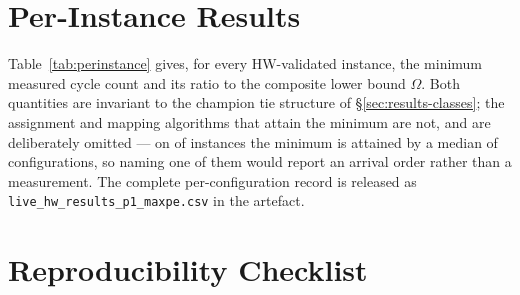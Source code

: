 \documentclass[journal,10pt]{IEEEtran}
\theoremstyle{plain}
\theoremstyle{definition}
\theoremstyle{remark}
\newcommand{\sv}[1]{\texttt{#1}}
\begin{document}
\section{Per-Instance Results}\label{app:perinstance}

Table~\ref{tab:perinstance} gives, for every HW-validated instance, the
minimum measured cycle count and its ratio to the composite lower bound
$\Omega$. Both quantities are invariant to the champion tie structure of
\S\ref{sec:results-classes}; the assignment and mapping algorithms that
attain the minimum are not, and are deliberately omitted --- on
\ClsTied{} of \TournNInst{} instances the minimum is attained by a median
of \ClsMedian{} configurations, so naming one of them would report an
arrival order rather than a measurement. The complete per-configuration
record is released as \sv{live\_hw\_results\_p1\_maxpe.csv} in the artefact.

\begin{table}[!t]
\caption{Per-instance minimum measured cycle count across the HW-validated
  suite. Cycle counts are the maximum over all PEs' \sv{perf\_total}
  counters; cyc/$\Omega$ is the distance to the composite lower bound of
  \S\ref{sec:method-lb}.}
\label{tab:perinstance}
\centering
\scriptsize
\renewcommand{\arraystretch}{1.1}

\end{table}

\section{Reproducibility Checklist}\label{app:repro}
\end{document}
